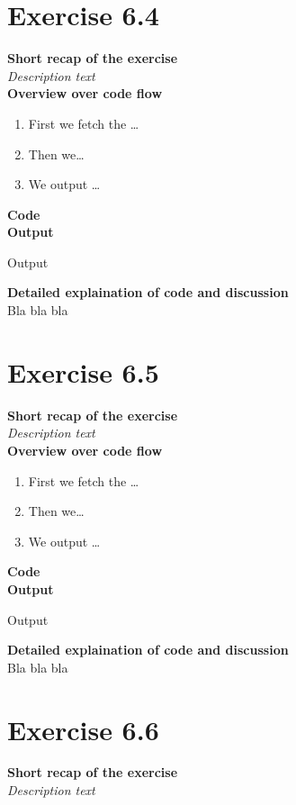 \documentclass{article}
\newcommand\pythonstyle{\lstset{
language=python,
breaklines=true,
basicstyle=\ttfamily\small,
otherkeywords={1, 2, 3, 4, 5, 6, 7, 8 ,9 , 0, -, =, +, [, ], (, ), \{, \}, :, *, !},             %
keywordstyle=\color{blue},
emph={class, pass, in, for, while, if, is, elif, else, not, and, or, OR
    def, print, exec, break, continue, return},
emphstyle=\color{black}\bfseries,
emph={[2]True, False, None, self},
emphstyle=[2]\color{purple},
emph={[3]from, import, as},
emphstyle=[3]\color{blue},
stringstyle=\color{red},
frame=tb,
showstringspaces=false,
morecomment=[s]{"""}{"""},
commentstyle=\color{gray},
rulesepcolor=\color{blue},
title=\lstname
}}
\newcommand\pythonexternal[2][]{{
\pythonstyle
}}
\begin{document}
\section{Exercise 6.4}
\textbf{Short recap of the exercise}\\
\textit{Description text}\\

\textbf{Overview over code flow}\\

\begin{enumerate}
  \item First we fetch the \ldots
  \item Then we\ldots
  \item We output \ldots\\
\end{enumerate}

\textbf{Code}\\
\textbf{Output}
\begin{pythonOutput}
Output
\end{pythonOutput}
\textbf{Detailed explaination of code and discussion}\\
Bla bla bla
\section{Exercise 6.5}
\textbf{Short recap of the exercise}\\
\textit{Description text}\\

\textbf{Overview over code flow}\\

\begin{enumerate}
  \item First we fetch the \ldots
  \item Then we\ldots
  \item We output \ldots\\
\end{enumerate}

\textbf{Code}\\
\textbf{Output}
\begin{pythonOutput}
Output
\end{pythonOutput}
\textbf{Detailed explaination of code and discussion}\\
Bla bla bla
\section{Exercise 6.6}
\textbf{Short recap of the exercise}\\
\textit{Description text}\\
\end{document}
